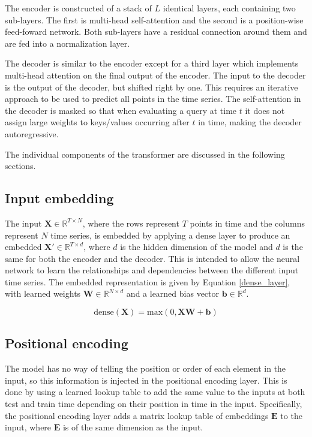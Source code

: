 The encoder is constructed of a stack of $L$ identical layers, each containing two sub-layers.
The first is multi-head self-attention and the second is a position-wise feed-foward network.
Both sub-layers have a residual connection around them and are fed into a normalization layer.

The decoder is similar to the encoder except for a third layer which implements multi-head attention on the final output of the encoder.
The input to the decoder is the output of the decoder, but shifted right by one.
This requires an iterative approach to be used to predict all points in the time series.
The self-attention in the decoder is masked so that when evaluating a query at time $t$ it does not assign large weights to keys/values occurring after $t$ in time, making the decoder autoregressive.

The individual components of the transformer are discussed in the following sections.

\subsection{Input embedding}
The input $\boldsymbol{X} \in \mathbb{R}^{T \times N}$, where the rows represent $T$ points in time and the columns represent $N$ time series, is embedded by applying a dense layer to produce an embedded $\boldsymbol{X'} \in \mathbb{R}^{T \times d}$, where $d$ is the hidden dimension of the model and $d$ is the same for both the encoder and the decoder.
This is intended to allow the neural network to learn the relationships and dependencies between the different input time series.
The embedded representation is given by Equation \ref{dense_layer}, with learned weights $\boldsymbol{W} \in \mathbb{R}^{N \times d}$ and a learned bias vector $\boldsymbol{b} \in \mathbb{R}^{d}$.

\begin{equation} \label{dense_layer}
\text{dense}(\boldsymbol{X}) = \text{max}(0, \boldsymbol{XW} + \boldsymbol{b})
\end{equation}

\subsection{Positional encoding} \label{sec:positional_encoding}
The model has no way of telling the position or order of each element in the input, so this information is injected in the positional encoding layer.
This is done by using a learned lookup table to add the same value to the inputs at both test and train time depending on their position in time in the input.
Specifically, the positional encoding layer adds a matrix lookup table of embeddings $\boldsymbol{E}$ to the input, where $\boldsymbol{E}$ is of the same dimension as the input.

